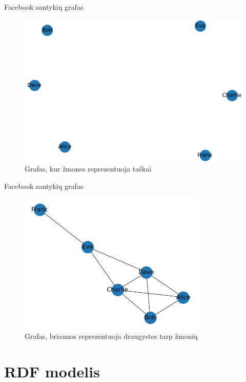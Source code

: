 \documentclass[10pt]{beamer}
\begin{document}
\begin{frame}[fragile]{Facebook santykių grafas}
    \begin{figure}[htbp]
          \centering
          \includegraphics[width=1\textwidth]{img/nodes.png}
          \caption{Grafas, kur žmones reprezentuoja taškai}
          \label{fig:nodes}
    \end{figure}
\end{frame}

\begin{frame}[fragile]{Facebook santykių grafas} 
    \begin{figure}[htbp]
          \centering
          \includegraphics[width=0.8\textwidth]{img/vertex.png}
          \caption{Grafas, briaunos reprezentuoja draugystes tarp žmonių}
          \label{fig:vertex}
    \end{figure}
\end{frame}

\section{RDF modelis}
\end{document}
